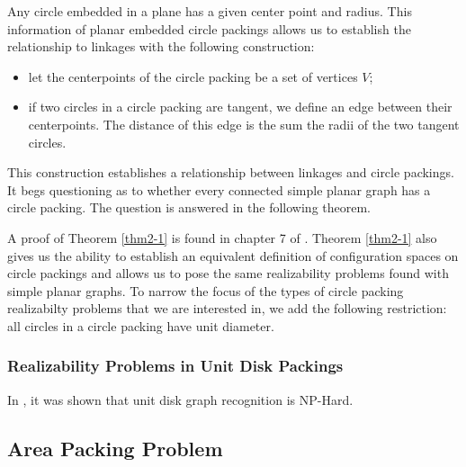 Any circle embedded in a plane has a given center point and radius.  This information of planar embedded circle packings allows us to establish the relationship to linkages with the following construction:
\begin{itemize}
\item[\rn{1}] let the centerpoints of the circle packing be a set of vertices $V$;
\item[\rn{2}] if two circles in a circle packing are tangent, we define an edge between their centerpoints.  The distance of this edge is the sum the radii of the two tangent circles.
\end{itemize}  
This construction establishes a relationship between linkages and circle packings.  It begs questioning as to whether every connected simple planar graph has a circle packing.  The question is answered in the following theorem.




A proof of Theorem \ref{thm2-1} is found in chapter 7 of \cite{stephenson2005introduction}.  Theorem \ref{thm2-1} also gives us the ability to establish an equivalent definition of configuration spaces on circle packings and allows us to pose the same realizability problems found with simple planar graphs.  To narrow the focus of the types of circle packing realizabilty problems that we are interested in, we add the following restriction: all circles in a circle packing have unit diameter. 
\subsubsection{Realizability Problems in Unit Disk Packings}
In \cite{Breu19983}, it was shown that unit disk graph recognition is NP-Hard. 
\subsection{Area Packing Problem}


